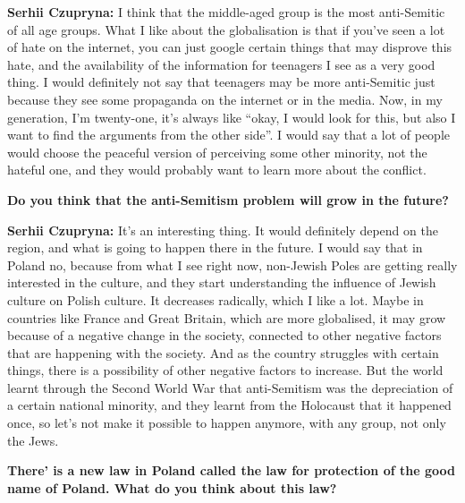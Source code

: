 \textbf{Serhii Czupryna:} I think that the middle-aged group is the most anti-Semitic of all age groups. What I like about the globalisation is that if you’ve seen a lot of hate on the internet, you can just google certain things that may disprove this hate, and the availability of the information for teenagers I see as a very good thing. I would definitely not say that teenagers may be more anti-Semitic just because they see some propaganda on the internet or in the media. Now, in my generation, I’m twenty-one, it’s always like ``okay, I would look for this, but also I want to find the arguments from the other side''. I would say that a lot of people would choose the peaceful version of perceiving some other minority, not the hateful one, and they would probably want to learn more about the conflict.\par
\textbf{Do you think that the anti-Semitism problem will grow in the future?}\par
\textbf{Serhii Czupryna:} It’s an interesting thing. It would definitely depend on the region, and what is going to happen there in the future. I would say that in Poland no, because from what I see right now, non-Jewish Poles are getting really interested in the culture, and they start understanding the influence of Jewish culture on Polish culture. It decreases radically, which I like a lot. Maybe in countries like France and Great Britain, which are more globalised, it may grow because of a negative change in the society, connected to other negative factors that are happening with the society. And as the country struggles with certain things, there is a possibility of other negative factors to increase. But the world learnt through the Second World War that anti-Semitism was the depreciation of a certain national minority, and they learnt from the Holocaust that it happened once, so let’s not make it possible to happen anymore, with any group, not only the Jews.\par
\textbf{There’ is a new law in Poland called the law for protection of the good name of Poland. What do you think about this law?} \par
